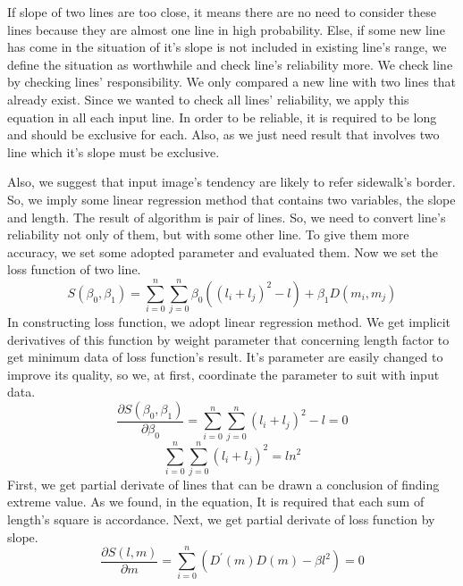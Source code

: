 If slope of two lines are too close, it means there are no need to consider these lines because they are almost one line in high probability. Else, if some new line has come in the situation of it's slope is not included in existing line's range, we define the situation as worthwhile and check line's reliability more. We check line by checking lines’ responsibility. We only compared a new line with two lines that already exist. Since we wanted to check all lines’ reliability, we apply this equation in all each input line. \newline
In order to be reliable, it is required to be long and should be exclusive for each. Also, as we just need result that involves two line which it's slope must be exclusive.

Also, we suggest that input image's tendency are likely to refer sidewalk's border. So, we imply some linear regression method that contains two variables, the slope and length.
The result of algorithm is pair of lines. So, we need to convert line's reliability not only of them, but with some other line. To give them more accuracy, we set some adopted parameter and evaluated them. Now we set the loss function of two line.
\begin{equation}
\mathit{S(\beta_{0},\beta_{1}) = \sum_{i=0}^{n}{\sum_{j=0}^{n}{\beta_{0}((l_{i}+l_{j})^{2} - l) + \beta_{1}D(m_i,m_j)}}}
\end{equation}
In constructing loss function, we adopt linear regression method. We get implicit derivatives of this function by weight parameter that concerning length factor to get minimum data of loss function's result. It's parameter are easily changed to improve its quality, so we, at first, coordinate the parameter to suit with input data.
\begin{equation}
\mathit{\frac{\partial S(\beta_{0},\beta_{1})}{\partial \beta_{0}} = \sum_{i=0}^{n}{\sum_{j=0}^{n}{(l_{i} + l_{j})^{2} - l}} = 0} 
\end{equation}
\begin{equation}
\mathit{\sum_{i=0}^{n}{\sum_{j=0}^{n}{(l_{i} + l_{j})^{2}}} = ln^{2}}
\end{equation}
First, we get partial derivate of lines that can be drawn a conclusion of finding extreme value. As we found, in the equation, It is required that each sum of length's square is accordance. Next, we get partial derivate of loss function by slope.
\begin{equation}
\mathit{\frac{\partial S\left(l,m\right)}{\partial m} = \sum_{i=0}^{n}{({D}^{\prime}(m)D(m) - \beta{l}^{2})} = 0}
\end{equation}
